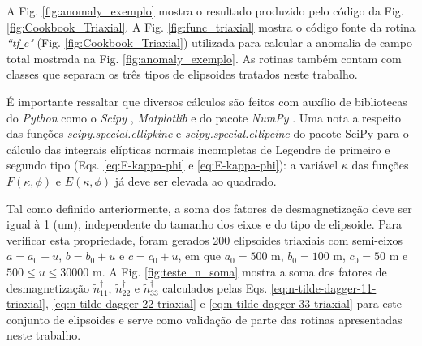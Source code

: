 A Fig. \ref{fig:anomaly_exemplo} mostra o resultado produzido pelo código da Fig. \ref{fig:Cookbook_Triaxial}. A Fig. \ref{fig:func_triaxial} mostra o código fonte da rotina \textit{``tf\underline{ }c"} (Fig. \ref{fig:Cookbook_Triaxial}) utilizada para calcular a anomalia de campo total mostrada na Fig. \ref{fig:anomaly_exemplo}.
As rotinas também contam com classes que separam os três tipos de elipsoides tratados neste trabalho.

É importante ressaltar que diversos cálculos são feitos com auxílio de bibliotecas do \textit{Python} como o \textit{Scipy} \citet{scipy}, \textit{Matplotlib} \citet{matplotlib} e do pacote \textit{NumPy} \citet{numpy}.
Uma nota a respeito das funções \textit{scipy.special.ellipkinc} e \textit{scipy.special.ellipeinc} do pacote SciPy para o cálculo das integrais elípticas normais incompletas de Legendre de primeiro e segundo tipo (Eqs. \ref{eq:F-kappa-phi} e \ref{eq:E-kappa-phi}): a variável $\kappa$ das funções $F(\kappa, \phi)$ e $E(\kappa, \phi)$ já deve ser elevada ao quadrado.

Tal como definido anteriormente, a soma dos fatores de desmagnetização deve ser igual à 1 (um), independente do tamanho dos eixos e do tipo de elipsoide. Para verificar esta propriedade, foram gerados 200 elipsoides triaxiais com semi-eixos $a = a_0 +u, \, b = b_0+u$ e $c = c_0+u$, em que $a_0=500$ m, $b_0=100$ m, $c_0=50$ m e $500  \le u \le 30000$ m. A Fig. \ref{fig:teste_n_soma} mostra a soma dos fatores de desmagnetização $\tilde{n}^{\dagger}_{11}$, $\tilde{n}^{\dagger}_{22}$ e $\tilde{n}^{\dagger}_{33}$ calculados pelas Eqs. \ref{eq:n-tilde-dagger-11-triaxial}, \ref{eq:n-tilde-dagger-22-triaxial} e \ref{eq:n-tilde-dagger-33-triaxial} para este conjunto de elipsoides e serve como validação de parte das rotinas apresentadas neste trabalho.

